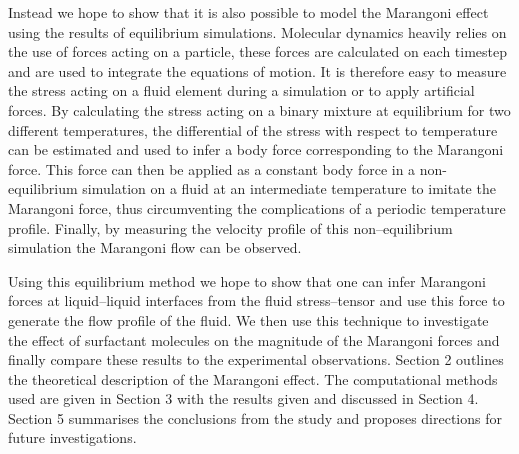Instead we hope to show that it is also possible to model the Marangoni effect using the results of equilibrium simulations. 
Molecular dynamics heavily relies on the use of forces acting on a particle, these forces are calculated on each timestep and are used to integrate the equations of motion.
It is therefore easy to measure the stress acting on a fluid element during a simulation or to apply artificial forces.
By calculating the stress acting on a binary mixture at equilibrium for two different temperatures, the differential of the stress with respect to temperature can be estimated and used to infer a body force corresponding to the Marangoni force.
This force can then be applied as a constant body force in a non-equilibrium simulation on a fluid at an intermediate temperature to imitate the Marangoni force, thus circumventing the complications of a periodic temperature profile.
Finally, by measuring the velocity profile of this non--equilibrium simulation the Marangoni flow can be observed.

Using this equilibrium method we hope to show that one can infer Marangoni forces at liquid--liquid interfaces from the fluid stress--tensor and use this force to generate the flow profile of the fluid.
We then use this technique to investigate the effect of surfactant molecules on the magnitude of the Marangoni forces and finally compare these results to the experimental observations.
Section 2 outlines the theoretical description of the Marangoni effect.
The computational methods used are given in Section 3 with the results given and discussed in Section 4.
Section 5 summarises the conclusions from the study and proposes directions for future investigations.
